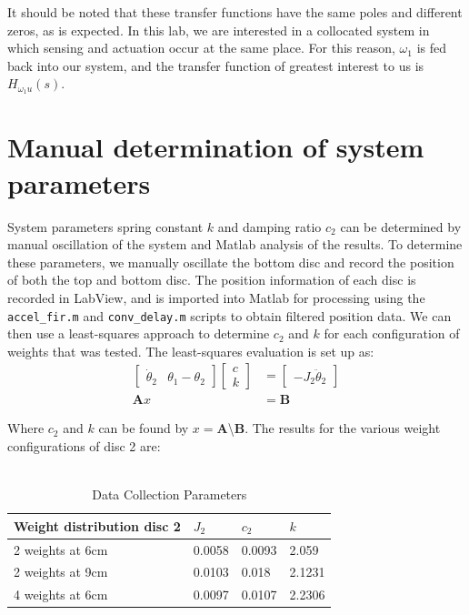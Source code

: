 \documentclass[11pt,titlepage]{article}
\begin{document}
	  It should be noted that these transfer functions have the same poles and different zeros, as is expected. In this lab, we are interested in a collocated system in which sensing and actuation occur at the same place. For this reason, $\omega_1$ is fed back into our system, and the transfer function of greatest interest to us is $H_{\omega_{1}u}(s)$.

\section{Manual determination of system parameters}
	System parameters spring constant $k$ and damping ratio $c_2$ can be determined by manual oscillation of the system and Matlab analysis of the results. To determine these parameters, we manually oscillate the bottom disc and record the position of both the top and bottom disc. The position information of each disc is recorded in LabView, and is imported into Matlab for processing using the \texttt{accel\_fir.m} and \texttt{conv\_delay.m} scripts to obtain filtered position data. We can then use a least-squares approach to determine $c_2$ and $k$ for each configuration of weights that was tested. The least-squares evaluation is set up as:
	\begin{align}
	\begin{bmatrix}
		\dot \theta_2 & \theta_1-\theta_2
	\end{bmatrix} 
	\begin{bmatrix}
		c\\
		k
	\end{bmatrix}&=
	\begin{bmatrix}
		-J_2\ddot \theta_2
	\end{bmatrix}\\
	\bm{A}x&=\bm{B}
	\end{align}
	
	Where $c_2$ and $k$ can be found by $x=\bm{A}$\textbackslash$\bm{B}$. The results for the various weight configurations of disc 2 are:\\\\
	
	        \begin{table}[H]
            \centering
            \begin{tabular}{|m{4cm}|m{3cm}|m{3cm}|m{3cm}|} 
                \hline
                Weight distribution disc 2 & $J_2$ & $c_2$ & $k$ \\ 
                \hline
                2 weights at 6cm & 0.0058 & 0.0093 & 2.059\\
                \hline
                2 weights at 9cm & 0.0103 & 0.018 & 2.1231\\
                \hline
                4 weights at 6cm & 0.0097 & 0.0107 & 2.2306\\
                \hline
            \end{tabular}
            \caption{Data Collection Parameters} \label{table:data_param}
        \end{table}
\end{document}
